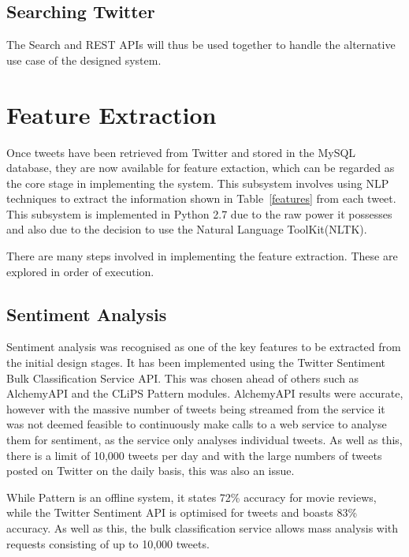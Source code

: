 \subsection{Searching Twitter}
The Search and REST APIs will thus be used together to handle the alternative use case of the designed system.




\section{Feature Extraction}
Once tweets have been retrieved from Twitter and stored in the MySQL database, they are now available for feature extaction, which can be regarded as the core stage in implementing the system. This subsystem involves using NLP techniques to extract the information shown in Table~\ref{features} from each tweet. This subsystem is implemented in Python 2.7 due to the raw power it possesses and also due to the decision to use the Natural Language ToolKit(NLTK)\cite{NLTK}.

There are many steps involved in implementing the feature extraction. These are explored in order of execution.

\subsection{Sentiment Analysis}
Sentiment analysis was recognised as one of the key features to be extracted from the initial design stages. It has been implemented using the Twitter Sentiment Bulk Classification Service API. This was chosen ahead of others such as AlchemyAPI\cite{alchemyapi} and the CLiPS Pattern modules. AlchemyAPI results were accurate, however with the massive number of tweets being streamed from the service it was not deemed feasible to continuously make calls to a web service to analyse them for sentiment, as the service only analyses individual tweets. As well as this, there is a limit of 10,000 tweets per day and with the large numbers of tweets posted on Twitter on the daily basis, this was also an issue.

While Pattern is an offline system, it states 72\% accuracy for movie reviews\cite{pattern}, while the Twitter Sentiment API is optimised for tweets and boasts 83\% accuracy\cite{Go_Bhayani_Huang_2009}. As well as this, the bulk classification service allows mass analysis with requests consisting of up to 10,000 tweets.

